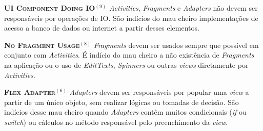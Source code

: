 

  \noindent
  \textsc{\textbf{{\small UI Component Doing IO}}}$^{(9)}$
      \textit{Activities}, \textit{Fragments} e \textit{Adapters} não devem ser responsáveis por operações de IO. São indícios do mau cheiro implementações de acesso a banco de dados ou internet a partir desses elementos.



  \noindent
  \textsc{\textbf{{\small No Fragment Usage}}}$^{(8)}$ \textit{Fragments} devem ser usados sempre que possível em conjunto com \textit{Activities}. É indício do mau cheiro a não existência de \textit{Fragments} na aplicação ou o uso de \textit{EditTexts}, \textit{Spinners} ou outras \textit{views} diretamente por \textit{Activities}.



  \noindent
  \textsc{\textbf{{\small Flex Adapter}}}$^{(6)}$ \textit{Adapters} devem ser responsáveis por popular uma \textit{view} a partir de um único objeto, sem realizar lógicas ou tomadas de decisão. São indícios desse mau cheiro quando \textit{Adapters} contêm muitos condicionais (\textit{if} ou \textit{switch}) ou cálculos no método responsável pelo preenchimento da \textit{view}.




